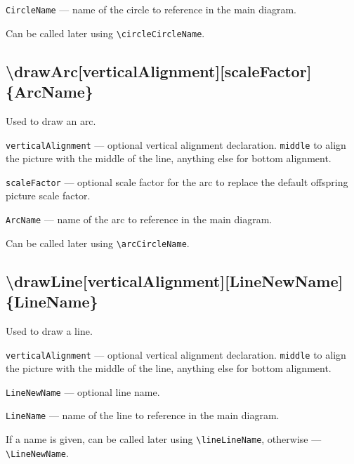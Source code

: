 \documentclass{ltxdoc}
\begin{document}
	\texttt{CircleName} — name of the circle to reference in the main diagram. 
	
	Can be called later using \texttt{\textbackslash circleCircleName}.
	
\subsection{\textbackslash drawArc[verticalAlignment][scaleFactor]\{ArcName\}}

	Used to draw an arc.

	\texttt{verticalAlignment} — optional vertical alignment declaration. \texttt{middle} to align the picture with the middle of the line, anything else for bottom alignment.
	
	\texttt{scaleFactor} — optional scale factor for the arc to replace the default offspring picture scale factor. 
	
	\texttt{ArcName} — name of the arc to reference in the main diagram. 
	
	Can be called later using \texttt{\textbackslash arcCircleName}.
	
\subsection{\textbackslash drawLine[verticalAlignment][LineNewName]\{LineName\}}

	Used to draw a line.

	\texttt{verticalAlignment} — optional vertical alignment declaration. \texttt{middle} to align the picture with the middle of the line, anything else for bottom alignment.
	
	\texttt{LineNewName} — optional line name. 
	
	\texttt{LineName} — name of the line to reference in the main diagram. 
	
	If a name is given, can be called later using \texttt{\textbackslash lineLineName}, otherwise — \texttt{\textbackslash LineNewName}. 
	
\end{document}
